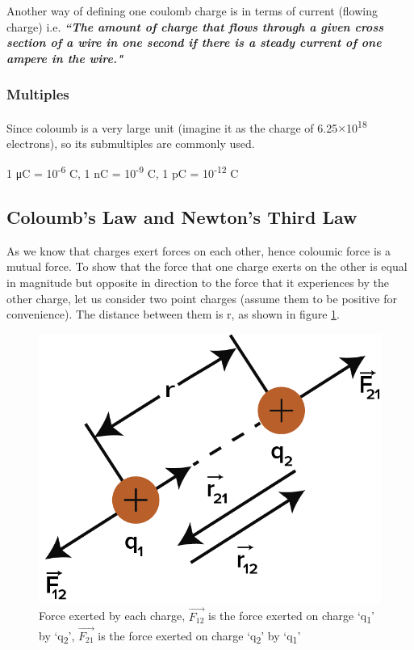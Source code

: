 Another way of defining one coulomb charge is in
terms of current (flowing charge) i.e. \textit{\textbf{``The amount of charge that flows
through a given cross section of a wire in one second if there is a steady
current of one ampere in the wire."}}
\subsubsection{Multiples}
Since coloumb is a very large unit (imagine it as the charge of 6.25$\times$10\textsuperscript{18} electrons),
so its submultiples are commonly used.
\begin{center}
1 μC = 10\textsuperscript{-6} C, 1 nC = 10\textsuperscript{-9} C,
1 pC = 10\textsuperscript{-12} C
\end{center}
\subsection{Coloumb's Law and Newton's Third Law}
As we know that charges exert forces on each other,
hence coloumic force is a mutual force.
To show that the force that one charge exerts on the other is
equal in magnitude but opposite in direction to the force that
it experiences by the other charge,
let us consider two point charges (assume them to be positive for convenience).
The distance between them is r, as shown in figure \ref{fig:11.1}.
\begin{figure}[H]
  \centering
  \includegraphics[scale = 0.8]{Images/11.1.png}
  \caption{Force exerted by each charge, $\vec{F_{12}}$ is the force
  exerted  on charge `q\textsubscript{1}' by `q\textsubscript{2}', $\vec{F_{21}}$ is the force exerted on charge `q\textsubscript{2}' by `q\textsubscript{1}'}
  \label{fig:11.1}
\end{figure}

